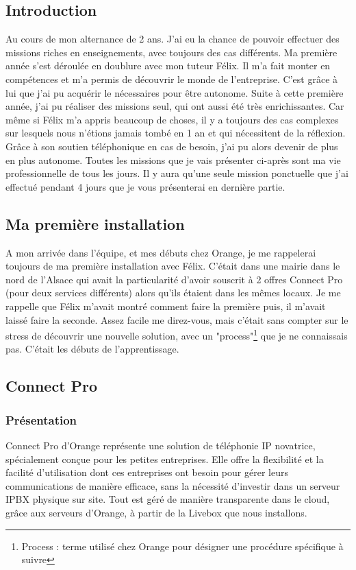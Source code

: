 \documentclass[12pt, a4paper]{article}
\begin{document}
\subsection{Introduction}
Au cours de mon alternance de 2 ans. J'ai eu la chance
de pouvoir effectuer des missions riches en 
enseignements, avec toujours des cas différents. 
Ma première année s'est déroulée en doublure avec 
mon tuteur Félix. Il m'a fait monter en compétences
et m'a permis de découvrir le monde de l'entreprise.
C'est grâce à lui que j'ai pu acquérir le
nécessaires pour être autonome. Suite à cette première
année, j'ai pu réaliser des missions seul, qui ont aussi 
été très enrichissantes. Car même si Félix m'a appris 
beaucoup de choses, il y a toujours des cas complexes 
sur lesquels nous n'étions jamais tombé en 1 an et
qui nécessitent de la réflexion. Grâce à son soutien 
téléphonique en cas de besoin, j'ai pu alors
devenir de plus en plus autonome. Toutes les missions 
que je vais présenter ci-après sont ma vie professionnelle
de tous les jours. Il y aura qu'une seule mission 
ponctuelle que j'ai effectué pendant 4 jours que je 
vous présenterai en dernière partie.

\subsection{Ma première installation}
A mon arrivée dans l'équipe, et mes débuts chez Orange, 
je me rappelerai toujours de ma première installation 
avec Félix. C'était dans une mairie dans le nord
de l'Alsace qui avait la particularité d'avoir 
souscrit à 2 offres Connect Pro (pour deux services différents) 
alors qu'ils étaient dans les mêmes locaux. Je me rappelle que Félix m'avait
montré comment faire la première puis, il m'avait laissé
faire la seconde. Assez facile me direz-vous, mais
c'était sans compter sur le stress de découvrir 
une nouvelle solution, avec un "process"\footnote{Process : terme utilisé chez Orange pour désigner une procédure spécifique à suivre} que je ne connaissais 
pas. C'était les débuts de l'apprentissage. 

\subsection{Connect Pro}
\subsubsection{Présentation}
Connect Pro d'Orange représente une solution
de téléphonie IP novatrice, spécialement conçue pour
les petites entreprises. Elle offre la flexibilité et
la facilité d'utilisation dont ces entreprises ont
besoin pour gérer leurs communications de manière
efficace, sans la nécessité d'investir dans un
serveur IPBX physique sur site. Tout est géré de
manière transparente dans le cloud, grâce aux
serveurs d'Orange, à partir de la Livebox
que nous installons.\\
\end{document}
